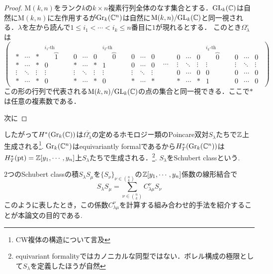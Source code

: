 \begin{proof}
  $\text{M}(k,n)$をランク$k$の$k\times n$複素行列全体のなす集合とする．$\text{GL}_k(\mathbb{C})$は自然に$\text{M}(k, n)$に左作用するが$\text{Gr}_k(\mathbb{C}^n)$は自然に$\text{M}(k,n)/\text{GL}_k(\mathbb{C})$と同一視される．$\lambda$を左から読んで$1\leq i_1<\cdots<i_k\leq n$番目に$1$が現れるとする．
  このとき$\Omega_\lambda^\circ$は
  \[
  \left(\begin{array}{ccc}
    {\begin{array}{ccccccccccc}
    * & \cdots & * & \overbrace{1}^{i_1\text{-th column}} & 0 & \cdots & 0 & \overbrace{0}^{i_{2}\text{-th column}} & 0 & \cdots & 0\\
    * & \cdots & * & 0 & * & \cdots & * & 1 & 0 & \cdots & 0\\
    \vdots & \ddots & \vdots & \vdots & \vdots & \ddots & \vdots & \vdots & \vdots & \ddots & \vdots\\
    * & \cdots & * & 0 & * & \cdots & * & 0 & * & \cdots & * 
    \end{array}} & \cdots & 
    {\begin{array}{ccccccc}
    0 & \cdots & 0 & \overbrace{0}^{i_{k}\text{-th column}} & 0 &\cdots & 0\\
    \vdots & \ddots & \vdots & \vdots & \vdots & \ddots & \vdots\\
    0 & \cdots & 0 & 0 & 0 & \cdots & 0\\
    * & \cdots & * & 1 & 0 & \cdots & 0
    \end{array}}
  \end{array}\right)
  \]
  この形の行列で代表される$\text{M}(k,n)/\text{GL}_k(\mathbb{C})$の点の集合と同一視できる．ここで$*$は任意の複素数である．

  次に
\end{proof}

したがって$H^*(\text{Gr}_k(\mathbb{C}))$は$\overline{\Omega_\lambda^\circ}$の定めるホモロジー類のPoincare双対$S_\lambda$たちで$\mathbb{Z}$上生成される\footnote{CW複体の構造について言及}. $\text{Gr}_k(\mathbb{C}^n)$はequivariantly formalであるから$H^*_T(\text{Gr}_k(\mathbb{C}^n))$は$H^*_T(\text{pt})=\mathbb{Z}[y_1,\cdots,y_n]$上$S_\lambda$たちで生成される．\footnote{equivariant formalityではカノニカルな同型ではない．ボレル構成の極限として$S_\lambda$を定義したほうが自然}. $S_\lambda$をSchubert classという.

$2$つのSchubert classの積$S_\lambda S_\mu$を$\{S_\nu\}_{\nu\in\binom{n}{k}}$の$\mathbb{Z}[y_1,\cdots,y_n]$係数の線形結合で
\[
S_\lambda S_\mu=\sum_{\nu\in\binom{n}{k}}C^\nu_{\lambda\mu}S_\nu
\]
このように表したとき，この係数$C^{\nu}_{\lambda\mu}$を計算する組み合わせ的手法を紹介することが本論文の目的である.





